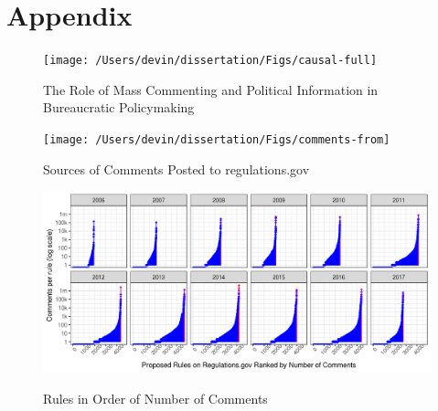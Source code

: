 \documentclass[
      12pt,
        ]{article}
\begin{document}
\newpage

\hypertarget{appendix-appendix}{%
\appendix}


\hypertarget{appendix}{%
\section*{Appendix}\label{appendix}}

\begin{figure}

{\centering \texttt{[image: /Users/devin/dissertation/Figs/causal-full]} 

}

\caption{The Role of Mass Commenting and Political Information in Bureaucratic Policymaking}\label{fig:causal-full}
\end{figure}

\begin{figure}

{\centering \texttt{[image: /Users/devin/dissertation/Figs/comments-from]} 

}

\caption{Sources of Comments Posted to regulations.gov}\label{fig:comments-from}
\end{figure}

\begin{figure}[h!]
    \centering
        \caption{Rules in Order of Number of Comments}
    \includegraphics[width = 6.5in]{../Figs/rules-ranked-comments-per-year-1.png}
    \label{fig:rules-ranked}
\end{figure}
\end{document}
